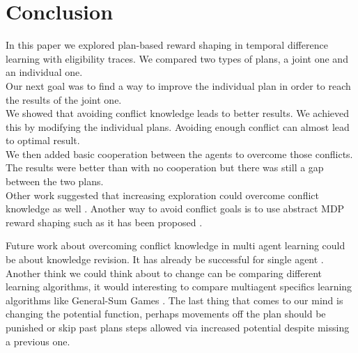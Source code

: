 \documentclass[letterpaper]{article}
\begin{document}
\section{Conclusion}
In this paper we explored plan-based reward shaping in temporal difference learning with eligibility traces. We compared two types of plans, a joint one and an individual one.\\

Our next goal was to find a way to improve the individual plan in order to reach the results of the joint one.\\
We showed that avoiding conflict knowledge leads to better results. We achieved this by modifying the individual plans. Avoiding enough conflict can almost lead to optimal result.\\
We then added basic cooperation between the agents to overcome those conflicts. The results were better than with no cooperation but there was still a gap between the two plans.\\

Other work suggested that increasing exploration could overcome conflict knowledge as well \citep{paper4}. Another way to avoid conflict goals is to use abstract MDP reward shaping such as it has been proposed \citep{abstractmdp}.

Future work about overcoming conflict knowledge in multi agent learning could be about knowledge revision. It has already be successful for single agent \citep{efthymiadis2014knowledge}. Another think we could think about to change can be comparing different learning algorithms, it would interesting to compare multiagent specifics learning algorithms like General-Sum Games \citep{devlin2013potential}. The last thing that comes to our mind is changing the potential function, perhaps movements off the plan should be punished or skip past plans steps allowed via increased potential despite missing a previous one.




\footnotesize


\end{document}
